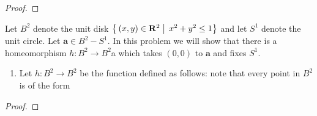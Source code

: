 \begin{proof}
\end{proof}
\newpage
\begin{problem}
Let $B^2$ denote the unit disk
$\left\{\,(x,y)\in\mathbf{R}^2\;\middle|\;\,x^2+y^2\leq 1\right\}$ and
let $S^1$ denote the unit circle. Let $\mathbf{a}\in B^2-S^1$. In
this problem we will show that there is a homeomorphism $h\colon
B^2\to B^2$a which takes $(0,0)$ to $\mathbf{a}$ and fixes $S^1$.
\begin{enumerate}[label=(\roman*)]
\item Let $h\colon B^2\to B^2$ be the function defined as
  follows: note that every point in $B^2$ is of the form
\end{enumerate}
\end{problem}
\begin{proof}
\end{proof}

